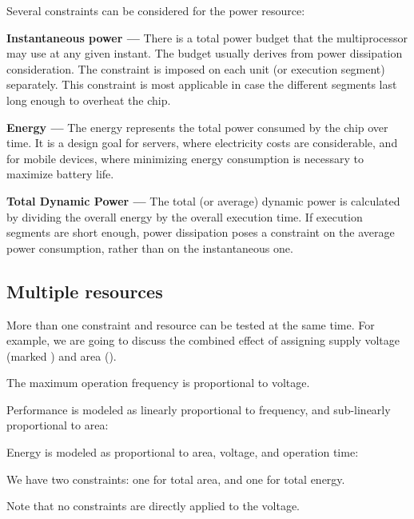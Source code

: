 \documentclass[twocolumn,english]{IEEEtran}
\begin{document}
Several constraints can be considered for the power resource:

\textbf{Instantaneous power ---} There is a total power budget that
the multiprocessor may use at any given instant. The budget usually
derives from power dissipation consideration. The constraint is imposed
on each unit (or execution segment) separately. This constraint is
most applicable in case the different segments last long enough to
overheat the chip. 




\textbf{Energy ---} The energy represents the total power consumed
by the chip over time. It is a design goal for servers, where electricity
costs are considerable, and for mobile devices, where minimizing energy
consumption is necessary to maximize battery life. 




\textbf{Total Dynamic Power ---} The total (or average) dynamic power
is calculated by dividing the overall energy by the overall execution
time. If execution segments are short enough, power dissipation poses
a constraint on the average power consumption, rather than on the
instantaneous one.





\subsection{Multiple resources}

More than one constraint and resource can be tested at the same time.
For example, we are going to discuss the combined effect of assigning
supply voltage (marked ) and area ().

The maximum operation frequency is proportional to voltage. 




Performance is modeled as linearly proportional to frequency, and
sub-linearly proportional to area:




Energy is modeled as proportional to area, voltage, and operation
time:




We have two constraints: one for total area, and one for total energy.







Note that no constraints are directly applied to the voltage. 

\textbf{}
\end{document}
